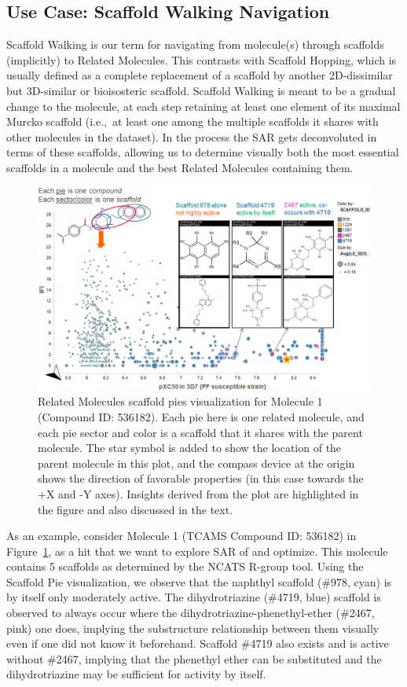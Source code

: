 \documentclass[journal=jacsat,manuscript=article]{achemso}
\newcommand*\fref[1]{Figure~\ref{fig:#1}}
\newcommand*\ie{i.e.,~}
\begin{document}
\subsection{Use Case: Scaffold Walking Navigation}
\label{sec:scafwalk}
Scaffold Walking is our term for navigating from molecule(s) through scaffolds (implicitly) to Related Molecules. This contrasts with Scaffold Hopping, which is usually defined as a complete replacement of a scaffold by another 2D-dissimilar but 3D-similar or bioisosteric scaffold. Scaffold Walking is meant to be a gradual change to the molecule, at each step retaining at least one element of its maximal Murcko scaffold (\ie at least one among the multiple scaffolds it shares with other molecules in the dataset).  In the process the SAR gets deconvoluted in terms of these scaffolds, allowing us to determine visually both the most essential scaffolds in a molecule and the best Related Molecules containing them.       
\begin{figure}
\includegraphics[width=6in]{fig/mol1_RGtool_scafpie.png}
\caption{Related Molecules scaffold pies visualization for Molecule 1 (Compound ID: 536182). Each pie here is one related molecule, and each pie sector and color is a scaffold that it shares with the parent molecule. The star symbol is added to show the location of the parent molecule in this plot, and the compass device at the origin shows the direction of favorable properties (in this case towards the +X and -Y axes). Insights derived from the plot are highlighted in the figure and also discussed in the text.}
\label{fig:scafwalk1}
\end{figure}

As an example, consider Molecule 1 (TCAMS Compound ID: 536182) in \fref{scafwalk1}, as a hit that we want to explore SAR of and optimize. This molecule contains 5 scaffolds as determined by the NCATS R-group tool. Using the Scaffold Pie visualization, we observe that the naphthyl scaffold (\#978, cyan) is by itself only moderately active.  The dihydrotriazine (\#4719, blue) scaffold is observed to always occur where the dihydrotriazine-phenethyl-ether (\#2467, pink) one does, implying the substructure relationship between them visually even if one did not know it beforehand. Scaffold \#4719 also exists and is active without \#2467, implying that the phenethyl ether can be substituted and the dihydrotriazine may be sufficient for activity by itself.
\end{document}

